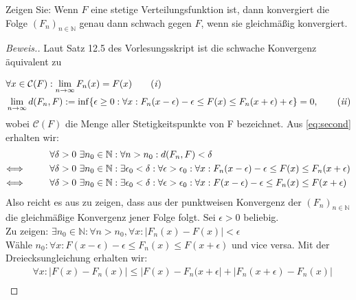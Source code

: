\begin{lemma}
    Zeigen Sie: Wenn $F$ eine stetige Verteilungsfunktion ist, dann konvergiert die Folge $(F_n)_{n \in \mathbb{N}}$ genau dann
    schwach gegen $F$, wenn sie gleichmäßig konvergiert.
\end{lemma}
\begin{proof}[Beweis.]
    Laut Satz 12.5 des Vorlesungsskript ist die schwache Konvergenz äquivalent zu

    \begin{align*}
    &\forall x \in \mathcal{C}(F): \lim_{n \rightarrow \infty} F_n(x) = F(x) \tag{\textit{i}} \label{eq:first} \\
    &\lim_{n \rightarrow \infty} d(F_n,F) := \inf \{\epsilon \geq 0: \forall x: F_n(x - \epsilon) - \epsilon \leq F(x) \leq F_n(x + \epsilon) + \epsilon\} = 0, \tag{\textit{ii}} \label{eq:second} \\
\end{align*}
    wobei $\mathcal{C}(F)$ die Menge aller Stetigkeitspunkte von F bezeichnet.
    Aus \ref{eq:second} erhalten wir:
\begin{align*}
    &\forall \delta > 0~ \exists n_0 \in \mathbb{N}: \forall n > n_0: d(F_n,F) < \delta\\
    \Longleftrightarrow \hspace{10mm} &\forall \delta > 0~ \exists n_0 \in \mathbb{N}: \exists \epsilon_0 < \delta: \forall \epsilon > \epsilon_0: \forall x: F_n(x - \epsilon) - \epsilon \leq F(x) \leq F_n(x + \epsilon) \\
    \Longleftrightarrow \hspace{10mm} &\forall \delta > 0~ \exists n_0 \in \mathbb{N}: \exists \epsilon_0 < \delta: \forall \epsilon > \epsilon_0: \forall x: F(x - \epsilon) - \epsilon \leq F_n(x) \leq F(x + \epsilon) \\
\end{align*}
Also reicht es aus zu zeigen, dass aus der punktweisen Konvergenz der $(F_n)_{n \in \mathbb{N}}$ die gleichmäßige Konvergenz jener Folge folgt.
Sei $\epsilon > 0$ beliebig. \\
Zu zeigen: $\exists n_0 \in \mathbb{N}: \forall n > n_0, \forall x: | F_n(x) - F(x) | < \epsilon $\\
Wähle $n_0: \forall x: F(x - \epsilon) - \epsilon \leq F_n(x) \leq F(x + \epsilon) $ und vice versa.
Mit der Dreiecksungleichung erhalten wir:
\begin{align*}
  &\forall x: | F(x) - F_n(x)| \leq | F(x) - F_n(x + \epsilon | + | F_n(x + \epsilon) - F_n(x) | \\

\end{align*}
\end{proof}
